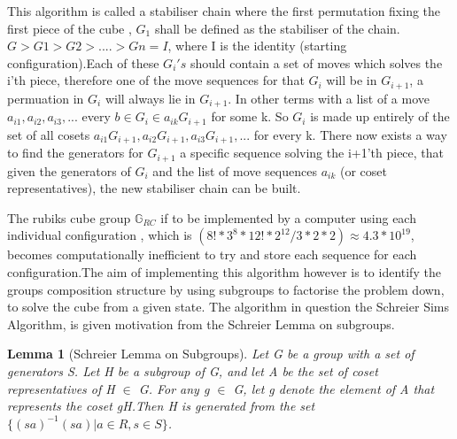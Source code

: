 \documentclass{article}
\newtheorem{lemma}[section]{Lemma}
\begin{document}
This algorithm is called a stabiliser chain where the first permutation fixing the first piece of the cube , $G_{1}$ shall be defined as the stabiliser of the chain.  $G > G1 > G2 > .... > Gn = I$, where I is the identity (starting configuration).Each of these $G_{i}'s$ should contain a set of moves which solves the i'th piece, therefore one of the move sequences for that $G_{i}$ will be in $G_{i+1}$, a permuation in $G_{i}$ will always lie in $G_{i+1}$. In other terms with a list  of a move $a_{i1},a_{i2},a_{i3}, ...$ every $b \in G_{i} \in a_{ik}G_{i+1}$ for some k. So $G_{i}$ is made up entirely of the set of all cosets $a_{i1}G_{i+1}, a_{i2}G_{i+1}, a_{i3}G_{i+1}, ... $ for every k. There now exists a way to find the generators for $G_{i+1}$ a specific sequence solving the i+1'th piece, that given the generators of $G_{i}$ and the list of move sequences $a_{ik}$ (or coset representatives), the new stabiliser chain can be built.\cite{Schreier}

The rubiks cube group $\mathbb{G}_{RC}$ if to be implemented by a computer using each individual configuration , which is $(8!*3^8*12!*2^12/3*2*2) \approx 4.3*10^{19}$, becomes computationally inefficient to try and store each sequence for each configuration.The aim of implementing this algorithm however is to identify the groups composition structure by using subgroups to factorise the problem down, to solve the cube from a given state. The algorithm in question the Schreier Sims Algorithm, is given motivation from the Schreier Lemma on subgroups.

\begin{lemma}[Schreier Lemma on Subgroups]
Let G be a group with a set of generators S. Let H be a subgroup of G, and let A be the set of coset representatives of H $\in$ G. For any g $\in$ G, let g denote the element of A that represents the coset gH.\newline Then H is generated from the set $\{(sa)^{-1} (sa) | a \in R, s \in S \}$. 
\end{lemma}
\end{document}
